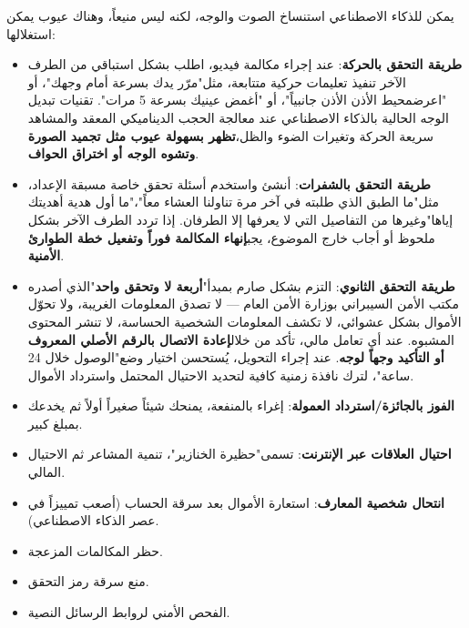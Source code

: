 يمكن للذكاء الاصطناعي استنساخ الصوت والوجه، لكنه ليس منيعاً، وهناك عيوب يمكن استغلالها:

\begin{itemize}
  \item \textbf{طريقة التحقق بالحركة}: عند إجراء مكالمة فيديو، اطلب بشكل استباقي من الطرف الآخر تنفيذ تعليمات حركية متتابعة، مثل"مرّر يدك بسرعة أمام وجهك"، أو "اعرضمحيط الأذن الأذن جانبياً"، أو "أغمض عينيك بسرعة 5 مرات". تقنيات تبديل الوجه الحالية بالذكاء الاصطناعي عند معالجة الحجب الديناميكي المعقد والمشاهد سريعة الحركة وتغيرات الضوء والظل،\textbf{تظهر بسهولة عيوب مثل تجميد الصورة وتشوه الوجه أو اختراق الحواف}.
  \item \textbf{طريقة التحقق بالشفرات}: أنشئ واستخدم أسئلة تحقق خاصة مسبقة الإعداد، مثل"ما الطبق الذي طلبته في آخر مرة تناولنا العشاء معاً"،"ما أول هدية أهديتك إياها"وغيرها من التفاصيل التي لا يعرفها إلا الطرفان. إذا تردد الطرف الآخر بشكل ملحوظ أو أجاب خارج الموضوع، يجب\textbf{إنهاء المكالمة فوراً وتفعيل خطة الطوارئ الأمنية}.
  \item \textbf{طريقة التحقق الثانوي}: التزم بشكل صارم بمبدأ"\textbf{أربعة لا وتحقق واحد}"الذي أصدره مكتب الأمن السيبراني بوزارة الأمن العام — لا تصدق المعلومات الغريبة، ولا تحوّل الأموال بشكل عشوائي، لا تكشف المعلومات الشخصية الحساسة، لا تنشر المحتوى المشبوه. عند أي تعامل مالي، تأكد من خلال\textbf{إعادة الاتصال بالرقم الأصلي المعروف أو التأكيد وجهاً لوجه}. عند إجراء التحويل، يُستحسن اختيار وضع"الوصول خلال 24 ساعة"، لترك نافذة زمنية كافية لتحديد الاحتيال المحتمل واسترداد الأموال.
\end{itemize}


\begin{itemize}
  \item \textbf{الفوز بالجائزة/استرداد العمولة}: إغراء بالمنفعة، يمنحك شيئاً صغيراً أولاً ثم يخدعك بمبلغ كبير.
  \item \textbf{احتيال العلاقات عبر الإنترنت}: تسمى"حظيرة الخنازير"، تنمية المشاعر ثم الاحتيال المالي.
  \item \textbf{انتحال شخصية المعارف}: استعارة الأموال بعد سرقة الحساب (أصعب تمييزاً في عصر الذكاء الاصطناعي).
\end{itemize}


\begin{itemize}
  \item حظر المكالمات المزعجة.
  \item منع سرقة رمز التحقق.
  \item الفحص الأمني لروابط الرسائل النصية.
\end{itemize}

